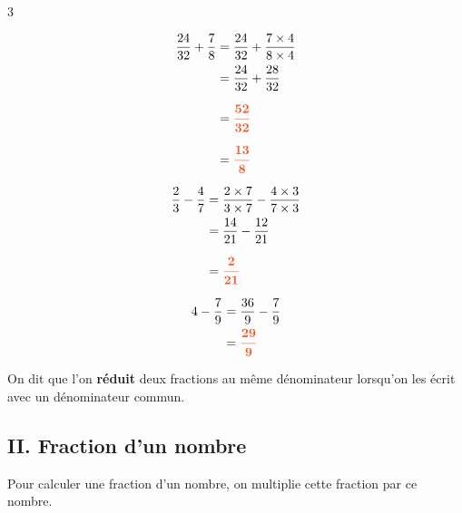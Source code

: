 \begin{Exemples}
{
  \setlength{\columnseprule}{0.4pt} %
  \renewcommand{\columnseprulecolor}{\color{Couleur10}}
\begin{multicols}{3}

\begin{align*}
\dfrac{24}{32} + \dfrac{7}{8} &= \dfrac{24}{32} + \dfrac{7\times 4}{8\times 4} \\
&=\dfrac{24}{32} + \dfrac{28}{32} \\[0.7em]
&={\color[HTML]{F15929}\boldsymbol{\dfrac{52}{32}}} \\[0.7em]
&= {\color[HTML]{F15929}\boldsymbol{\dfrac{13}{8}}}
\end{align*}


\columnbreak


\begin{align*}
\dfrac{2}{3} - \dfrac{4}{7} &= \dfrac{2\times 7}{3\times 7} -\dfrac{4\times 3}{7\times 3} \\
&= \dfrac{14}{21} - \dfrac{12}{21} \\[0.7em]
&= {\color[HTML]{F15929}\boldsymbol{\dfrac{2}{21}}}
\end{align*}

\columnbreak


\begin{align*}
4 - \dfrac{7}{9} &= \dfrac{36}{9} - \dfrac{7}{9} \\
&= {\color[HTML]{F15929}\boldsymbol{\dfrac{29}{9}}}
\end{align*}

\end{multicols}
}
\end{Exemples}


\vspace{0.3cm}
\begin{Remarque}
On dit que l'on \textbf{réduit} deux fractions au même dénominateur lorsqu'on les écrit avec un dénominateur commun.
\end{Remarque}


\newpage
\subsection*{II. Fraction d'un nombre}

\begin{Propriété}[c]
Pour calculer une fraction d'un nombre, on multiplie cette fraction par ce nombre.
\end{Propriété}


